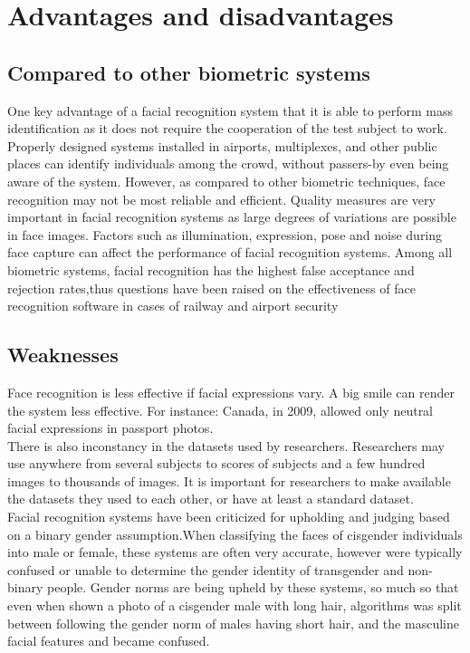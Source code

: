 \documentclass[12pt,letterpaper, onecolumn]{exam}
\begin{document}
    \section{Advantages and disadvantages}
    \subsection{Compared to other biometric systems}
    One key advantage of a facial recognition system that it is able to perform mass identification as it does not require the cooperation of the test subject to work. Properly designed systems installed in airports, multiplexes, and other public places can identify individuals among the crowd, without passers-by even being aware of the system. However, as compared to other biometric techniques, face recognition may not be most reliable and efficient. Quality measures are very important in facial recognition systems as large degrees of variations are possible in face images. Factors such as illumination, expression, pose and noise during face capture can affect the performance of facial recognition systems. Among all biometric systems, facial recognition has the highest false acceptance and rejection rates,thus questions have been raised on the effectiveness of face recognition software in cases of railway and airport security
    
    \subsection{Weaknesses}
    Face recognition is less effective if facial expressions vary. A big smile can render the system less effective. For instance: Canada, in 2009, allowed only neutral facial expressions in passport photos.\\
    There is also inconstancy in the datasets used by researchers. Researchers may use anywhere from several subjects to scores of subjects and a few hundred images to thousands of images. It is important for researchers to make available the datasets they used to each other, or have at least a standard dataset.\\
    Facial recognition systems have been criticized for upholding and judging based on a binary gender assumption.When classifying the faces of cisgender individuals into male or female, these systems are often very accurate, however were typically confused or unable to determine the gender identity of transgender and non-binary people. Gender norms are being upheld by these systems, so much so that even when shown a photo of a cisgender male with long hair, algorithms was split between following the gender norm of males having short hair, and the masculine facial features and became confused.
    
\end{document}
